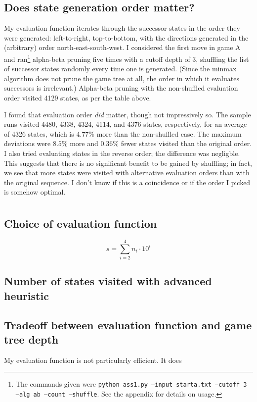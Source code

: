 \documentclass[letterpaper, 12pt]{article}
\numberwithin{theorem}{section}
\begin{document}
\subsection{Does state generation order matter?}
My evaluation function iterates through the successor states in the order they were generated: left-to-right, top-to-bottom, with the directions generated in the (arbitrary) order north-east-south-west. I considered the first move in game A and ran\footnote{The commands given were \texttt{python ass1.py --input starta.txt --cutoff 3 --alg ab --count --shuffle}. See the appendix for details on usage.} alpha-beta pruning five times with a cutoff depth of 3, shuffling the list of successor states randomly every time one is generated. (Since the minmax algorithm does not prune the game tree at all, the order in which it evaluates successors is irrelevant.) Alpha-beta pruning with the non-shuffled evaluation order visited 4129 states, as per the table above. 

I found that evaluation order \emph{did} matter, though not impressively so. The sample runs visited 4480, 4338, 4324, 4114, and 4376 states, respectively, for an average of 4326 states, which is $4.77\%$ more than the non-shuffled case. The maximum deviations were $8.5\%$ more and $0.36\%$ fewer states visited than the original order. I also tried evaluating states in the reverse order; the difference was negligble. This suggests that there is no significant benefit to be gained by shuffling; in fact, we see that more states were visited with alternative evaluation orders than with the original sequence. I don't know if this is a coincidence or if the order I picked is somehow optimal.


\section{}
\subsection{Choice of evaluation function}
\[ s = \sum_{i=2}^4 n_i \cdot 10^i \]

\subsection{Number of states visited with advanced heuristic}

\subsection{Tradeoff between evaluation function and game tree depth}
My evaluation function is not particularly efficient. It does 
\end{document}

